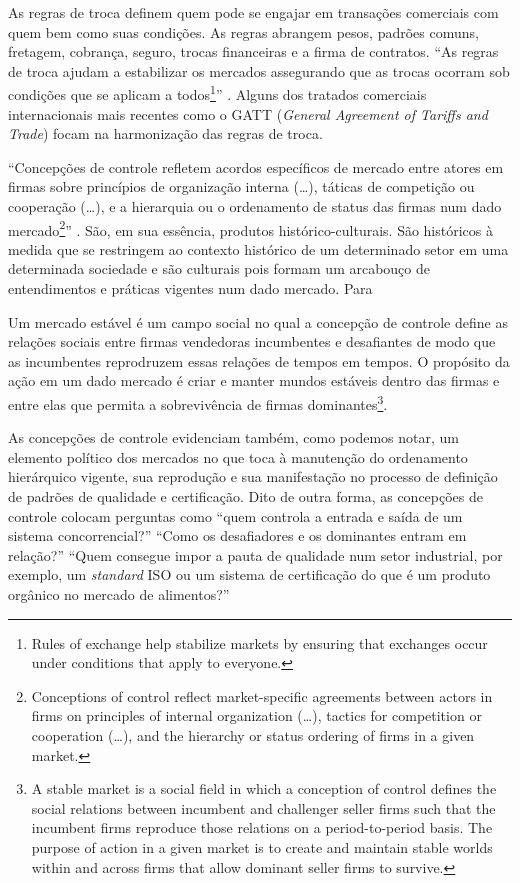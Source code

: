 \documentclass[a4paper, 12pt, openright, oneside, german, french, english, brazil]{abntex2}
\begin{document}
	As regras de troca definem quem pode se engajar em transações comerciais com quem bem como suas condições. As regras abrangem pesos, padrões comuns, fretagem, cobrança, seguro, trocas financeiras e a firma de contratos. ``As regras de troca ajudam a estabilizar os mercados assegurando que as trocas ocorram sob condições que se aplicam a todos\footnote{Rules of exchange help stabilize markets by ensuring that exchanges occur under conditions that apply to everyone.}'' \cite[p. 35]{fligstein2002architecture}. Alguns dos tratados comerciais internacionais mais recentes como o GATT (\textit{General Agreement of Tariffs and Trade}) focam na harmonização das regras de troca.

	``Concepções de controle refletem acordos específicos de mercado entre atores em firmas sobre princípios de organização interna (\dots), táticas de competição ou cooperação (\dots), e a hierarquia ou o ordenamento de status das firmas num dado mercado\footnote{Conceptions of control reflect market-specific agreements between actors in firms on principles of internal organization (\dots), tactics for competition or cooperation (\dots), and the hierarchy or status ordering of firms in a given market.}'' \cite[p. 35]{fligstein2002architecture}. São, em sua essência, produtos histórico-culturais. São históricos à medida que se restringem ao contexto histórico de um determinado setor em uma determinada sociedade e são culturais pois formam um arcabouço de entendimentos e práticas vigentes num dado mercado. Para 

	\begin{citacao}
		Um mercado estável é um campo social no qual a concepção de controle define as relações sociais entre firmas vendedoras incumbentes e desafiantes de modo que as incumbentes reprodruzem essas relações de tempos em tempos. O propósito da ação em um dado mercado é criar e manter mundos estáveis dentro das firmas e entre elas que permita a sobrevivência de firmas dominantes\footnote{A stable market is a social field in which a conception of control defines the social relations between incumbent and challenger seller firms such that the incumbent firms reproduce those relations on a period-to-period basis. The purpose of action in a given market is to create and maintain stable worlds within and across firms that allow dominant seller firms to survive.}. \cite[p. 35]{fligstein2002architecture}
	\end{citacao}

	As concepções de controle evidenciam também, como podemos notar, um elemento político dos mercados no que toca à manutenção do ordenamento hierárquico vigente, sua reprodução e sua manifestação no processo de definição de padrões de qualidade e certificação. Dito de outra forma, as concepções de controle colocam perguntas como ``quem controla a entrada e saída de um sistema concorrencial?'' ``Como os desafiadores e os dominantes entram em relação?'' ``Quem consegue impor a pauta de qualidade num setor industrial, por exemplo, um \textit{standard} ISO ou um sistema de certificação do que é um produto orgânico no mercado de alimentos?''
\end{document}
